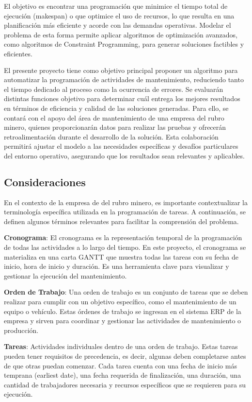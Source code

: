 \documentclass{article}
\begin{document}
El objetivo es encontrar una programación que minimice el tiempo total de ejecución (makespan) o que optimice el uso de recursos, lo que resulta en una planificación más eficiente y acorde con las demandas operativas. Modelar el problema de esta forma permite aplicar algoritmos de optimización avanzados, como algoritmos de Constraint Programming, para generar soluciones factibles y eficientes.

El presente proyecto tiene como objetivo principal proponer un algoritmo para automatizar la programación de actividades de mantenimiento, reduciendo tanto el tiempo dedicado al proceso como la ocurrencia de errores. Se evaluarán distintas funciones objetivo para determinar cuál entrega los mejores resultados en términos de eficiencia y calidad de las soluciones generadas. Para ello, se contará con el apoyo del área de mantenimiento de una empresa del rubro minero, quienes proporcionarán datos para realizar las pruebas y ofrecerán retroalimentación durante el desarrollo de la solución. Esta colaboración permitirá ajustar el modelo a las necesidades específicas y desafíos particulares del entorno operativo, asegurando que los resultados sean relevantes y aplicables.


\subsection{Consideraciones}
En el contexto de la empresa de del rubro minero, es importante contextualizar la terminología específica utilizada en la programación de tareas. A continuación, se definen algunos términos relevantes para facilitar la comprensión del problema.

\textbf{Cronograma}: El cronograma es la representación temporal de la programación de todas las actividades a lo largo del tiempo. En este proyecto, el cronograma se materializa en una carta GANTT que muestra todas las tareas con su fecha de inicio, hora de inicio y duración. Es una herramienta clave para visualizar y gestionar la ejecución del mantenimiento.

\textbf{Orden de Trabajo}: Una orden de trabajo es un conjunto de tareas que se deben realizar para cumplir con un objetivo específico, como el mantenimiento de un equipo o vehículo. Estas órdenes de trabajo se ingresan en el sistema ERP de la empresa y sirven para coordinar y gestionar las actividades de mantenimiento o producción.

\textbf{Tareas}: Actividades individuales dentro de una orden de trabajo. Estas tareas pueden tener requisitos de precedencia, es decir, algunas deben completarse antes de que otras puedan comenzar. Cada tarea cuenta con una fecha de inicio más temprana (earliest date), una fecha requerida de finalización, una duración, una cantidad de trabajadores necesaria y recursos específicos que se requieren para su ejecución.
\end{document}
